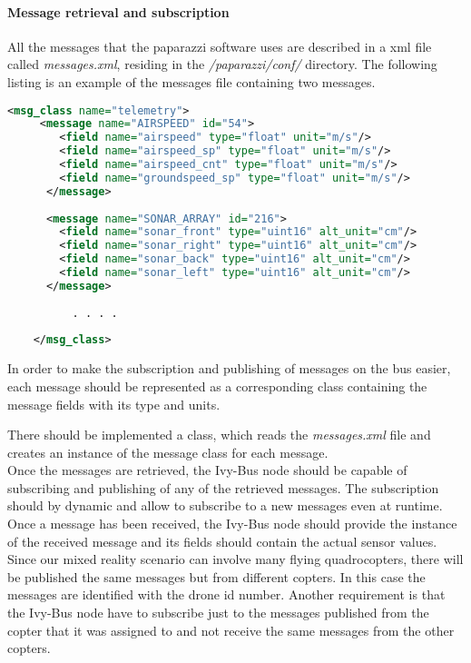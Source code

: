     \paragraph{Message retrieval and subscription}
    \label{par:messageRetrieval}
    
    All the messages that the paparazzi software uses are described in a xml file called \textit{messages.xml}, residing in the \textit{/paparazzi/conf/} directory. The following listing is an example of the messages file containing two messages.
    
    \begin{lstlisting}[basicstyle=\tiny, caption={Message Xml definition}, label={lst:MessageXml}, language = Xml]
    <msg_class name="telemetry">
     <message name="AIRSPEED" id="54">
        <field name="airspeed" type="float" unit="m/s"/>
        <field name="airspeed_sp" type="float" unit="m/s"/>
        <field name="airspeed_cnt" type="float" unit="m/s"/>
        <field name="groundspeed_sp" type="float" unit="m/s"/>
      </message>
      
      <message name="SONAR_ARRAY" id="216">
    	<field name="sonar_front" type="uint16" alt_unit="cm"/>
    	<field name="sonar_right" type="uint16" alt_unit="cm"/>
    	<field name="sonar_back" type="uint16" alt_unit="cm"/>
    	<field name="sonar_left" type="uint16" alt_unit="cm"/>
      </message>
    	
    	  . . . . 
    	  
    </msg_class>
    \end{lstlisting}
    
    In order to make the subscription and publishing of messages on the bus easier, each message should be represented as a corresponding class containing the message fields with its type and units.
    
    There should be implemented a class, which reads the \textit{messages.xml} file and creates an instance of the message class for each message. \\
    Once the messages are retrieved, the Ivy-Bus node should be capable of subscribing and publishing of any of the retrieved messages. The subscription should by dynamic and allow to subscribe to a new messages even at runtime. \\
    Once a message has been received, the Ivy-Bus node should provide the instance of the received message and its fields should contain the actual sensor values.\\
    Since our mixed reality scenario can involve many flying quadrocopters, there will be published the same messages but from different copters. In this case the messages are identified with the drone id number.
    Another requirement is that the Ivy-Bus node have to subscribe just to the messages published from the copter that it was assigned to and not receive the same messages from the other copters.
    
